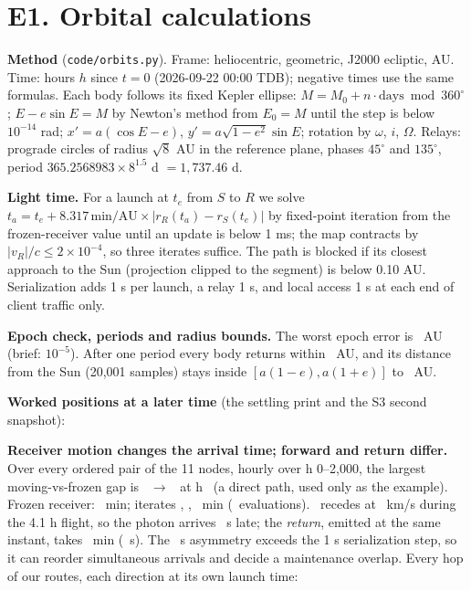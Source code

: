 \section*{E1. Orbital calculations}

\textbf{Method} (\texttt{code/orbits.py}). Frame: heliocentric, geometric, J2000 ecliptic, AU. Time: hours $h$ since $t=0$ (2026-09-22 00:00 TDB); negative times use the same
formulas. Each body follows its fixed Kepler ellipse: $M = M_0 + n\cdot\text{days} \bmod 360^\circ$; $E - e\sin E = M$ by Newton's method from $E_0 = M$ until the step is below
$10^{-14}$ rad; $x' = a(\cos E - e)$, $y' = a\sqrt{1-e^2}\sin E$; rotation by $\omega$, $i$, $\Omega$. Relays: prograde circles of radius $\sqrt8$ AU in the reference plane, phases
$45^\circ$ and $135^\circ$, period $365.2568983 \times 8^{1.5}$ d $= 1{,}737.46$ d.

\textbf{Light time.} For a launch at $t_e$ from $S$ to $R$ we solve $t_a = t_e + 8.317\,\text{min/AU} \times |r_R(t_a) - r_S(t_e)|$ by fixed-point iteration from the frozen-receiver
value until an update is below 1 ms; the map contracts by $|v_R|/c \le 2\times10^{-4}$, so three iterates suffice. The path is blocked if its closest approach to the Sun (projection
clipped to the segment) is below 0.10 AU. Serialization adds 1 s per launch, a relay 1 s, and local access 1 s at each end of client traffic only.

\textbf{Epoch check, periods and radius bounds.} The worst epoch error is \EoneWorstErr\ AU (brief: $10^{-5}$). After one period every body returns within \EoneWorstClose\ AU, and its
distance from the Sun (20{,}001 samples) stays inside $[a(1-e), a(1+e)]$ to \EoneRadSlack\ AU.
\begin{center}\setlength{\tabcolsep}{3pt}\end{center}

\textbf{Worked positions at a later time} (the settling print and the S3 second snapshot):
\begin{center}\setlength{\tabcolsep}{4pt}\end{center}

\textbf{Receiver motion changes the arrival time; forward and return differ.} Over every ordered pair of the 11 nodes, hourly over h 0--2{,}000, the largest moving-vs-frozen gap is
\EoneExSender\ $\to$ \EoneExReceiver\ at h \EoneExTe\ (a direct path, used only as the example). Frozen receiver: \EoneFrozenMin\ min; iterates \EoneItA, \EoneItB, \EoneItC\ min
(\EoneFwdIters\ evaluations). \EoneExReceiver\ recedes at \EoneRxRadialKms\ km/s during the 4.1 h flight, so the photon arrives \EoneFwdShiftS\ s late; the \emph{return}, emitted at
the same instant, takes \EoneRevMin\ min (\EoneRevShiftS\ s). The \EoneAsymS\ s asymmetry exceeds the 1 s serialization step, so it can reorder simultaneous arrivals and decide a maintenance overlap. Every hop of our routes, each direction at its own launch time:
\begin{center}\end{center}
